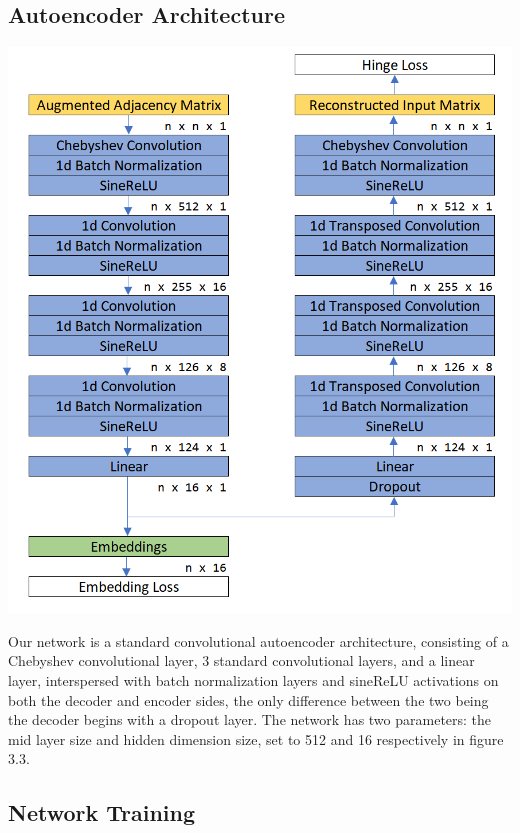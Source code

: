 \documentclass[12pt,twoside]{report}
\begin{document}
\subsection{Autoencoder Architecture}


\begin{center}

\includegraphics[width=\linewidth]{diagram/please.PNG}
\end{center}


Our network is a standard convolutional autoencoder architecture, consisting of a Chebyshev convolutional layer, 3 standard convolutional layers, and a linear layer, interspersed with batch normalization layers and sineReLU activations on both the decoder and encoder sides, the only difference between the two being the decoder begins with a dropout layer. The network has two parameters: the mid layer size and hidden dimension size, set to 512 and 16 respectively in figure 3.3. \\

\subsection{Network Training}
\end{document}
